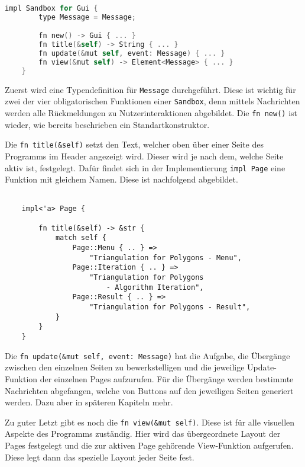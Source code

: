 \begin{lstlisting}[language=C]
    impl Sandbox for Gui {
        type Message = Message;

        fn new() -> Gui { ... }
        fn title(&self) -> String { ... }
        fn update(&mut self, event: Message) { ... }
        fn view(&mut self) -> Element<Message> { ... }
    }
\end{lstlisting}

Zuerst wird eine Typendefinition für \lstinline{Message} durchgeführt. Diese ist wichtig für zwei der vier obligatorischen Funktionen einer \lstinline{Sandbox}, denn 
mittels Nachrichten werden alle Rückmeldungen zu Nutzerinteraktionen abgebildet. Die \lstinline{fn new()} ist wieder, wie bereits beschrieben ein Standartkonstruktor.

Die \lstinline{fn title(&self)} setzt den Text, welcher oben über einer Seite des Programms im Header angezeigt wird. Dieser wird je nach dem, welche Seite aktiv ist,
festgelegt. Dafür findet sich in der Implementierung \lstinline{impl Page} eine Funktion mit gleichem Namen. Diese ist nachfolgend abgebildet.

\begin{lstlisting}
  
    impl<'a> Page {
        
        fn title(&self) -> &str {
            match self {
                Page::Menu { .. } => 
                    "Triangulation for Polygons - Menu",
                Page::Iteration { .. } => 
                    "Triangulation for Polygons 
                        - Algorithm Iteration",
                Page::Result { .. } => 
                    "Triangulation for Polygons - Result",
            }
        }
    }

\end{lstlisting}

Die \lstinline{fn update(&mut self, event: Message)} hat die Aufgabe, die Übergänge zwischen den einzelnen Seiten zu bewerkstelligen und die jeweilige Update-Funktion 
der einzelnen Pages aufzurufen. Für die Übergänge werden bestimmte Nachrichten abgefangen, welche von Buttons auf den jeweiligen Seiten generiert werden. Dazu aber in späteren Kapiteln mehr.

Zu guter Letzt gibt es noch die \lstinline{fn view(&mut self)}. Diese ist für alle visuellen Aspekte des Programms zuständig. Hier wird das übergeordnete Layout der Pages festgelegt und die 
zur aktiven Page gehörende View-Funktion aufgerufen. Diese legt dann das spezielle Layout jeder Seite fest.

